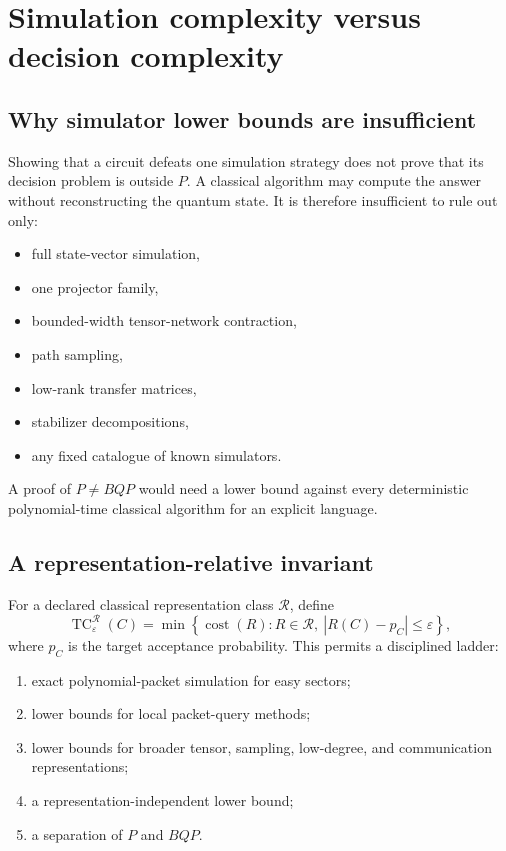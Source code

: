 \chapter{Simulation complexity versus decision complexity}
\label{ch:decision-complexity}

\section{Why simulator lower bounds are insufficient}
Showing that a circuit defeats one simulation strategy does not prove that its decision problem is outside $P$. A classical algorithm may compute the answer without reconstructing the quantum state. It is therefore insufficient to rule out only:

\begin{itemize}
\item full state-vector simulation,
\item one projector family,
\item bounded-width tensor-network contraction,
\item path sampling,
\item low-rank transfer matrices,
\item stabilizer decompositions,
\item any fixed catalogue of known simulators.
\end{itemize}

A proof of $P\neq BQP$ would need a lower bound against every deterministic polynomial-time classical algorithm for an explicit language.

\section{A representation-relative invariant}
For a declared classical representation class $\mathcal R$, define
\[
\operatorname{TC}^{\mathcal R}_\varepsilon(C)
=
\min\left\{
\operatorname{cost}(R):
R\in\mathcal R,
\ |R(C)-p_C|\le\varepsilon
\right\},
\]
where $p_C$ is the target acceptance probability. This permits a disciplined ladder:

\begin{enumerate}
\item exact polynomial-packet simulation for easy sectors;
\item lower bounds for local packet-query methods;
\item lower bounds for broader tensor, sampling, low-degree, and communication representations;
\item a representation-independent lower bound;
\item a separation of $P$ and $BQP$.
\end{enumerate}

